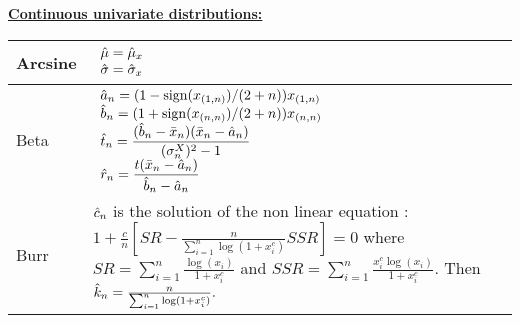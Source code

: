 {  \underline{\textbf{Continuous univariate distributions:}}\\

  \begin{tabular}{|l|p{12cm}|}
    \hline
    Arcsine & $\begin{array}{l}
      \displaystyle\Hat{\mu} = \Hat{\mu}_x\\
      \displaystyle\Hat{\sigma} = \Hat{\sigma}_x\\
    \end{array}$\\
    \hline
    Beta & $\begin{array}{l}
      \displaystyle\Hat{a}_n=(1-\mathrm{sign}(x_{(1,n)})/(2+n))x_{(1,n)}\\
      \displaystyle\Hat{b}_n=(1+\mathrm{sign}(x_{(n,n)})/(2+n))x_{(n,n)}\\
      \displaystyle\Hat{t}_n=\frac{(\Hat{b}_n-\bar{x}_n)(\bar{x}_n-\Hat{a}_n)}{(\sigma_n^X)^2-1}\\
      \displaystyle\Hat{r}_n=\frac{t(\bar{x}_n-\Hat{a}_n)}{\Hat{b}_n-\Hat{a}_n}
    \end{array}$\\
    \hline
    Burr & $\Hat{c}_n$ is the solution of the non linear equation :
    $
    \displaystyle 1+\frac{c}{n}\left[ SR - \frac{n}{\sum_{i=1}^n \log(1+x_i^c)}SSR\right] = 0
    $
    where $ \displaystyle SR = \displaystyle \sum_{i=1}^n \frac{ \log(x_i)}{1+x_i^c}$ and $ \displaystyle SSR = \displaystyle \sum_{i=1}^n \frac{ x_i^c\log(x_i)}{1+x_i^c}$.
    Then
    $
    \Hat{k}_n =  \frac{n}{\sum_{i=1}^n \log(1+x_i^c)}.
    $
    \\
    \hline
  \end{tabular}\rule{0pt}{1em}\\

}
